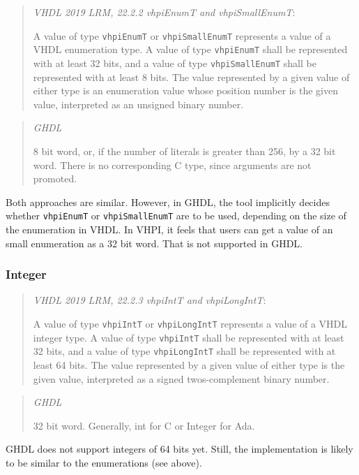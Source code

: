 \documentclass[
]{article}
\begin{document}
\begin{quote}
\emph{VHDL 2019 LRM, 22.2.2 vhpiEnumT and vhpiSmallEnumT}:

A value of type \texttt{vhpiEnumT} or \texttt{vhpiSmallEnumT} represents a value of a VHDL enumeration type.
A value of type \texttt{vhpiEnumT} shall be represented with at least 32 bits, and a value of type \texttt{vhpiSmallEnumT} shall be represented with at least 8 bits.
The value represented by a given value of either type is an enumeration value whose position number is the given value, interpreted as an unsigned binary number.
\end{quote}

\begin{quote}
\emph{GHDL}

8 bit word, or, if the number of literals is greater than 256, by a 32 bit word. There is no corresponding C type, since arguments are not promoted.
\end{quote}

Both approaches are similar. However, in GHDL, the tool implicitly decides whether \texttt{vhpiEnumT} or \texttt{vhpiSmallEnumT} are to be used, depending on the size of the enumeration in VHDL. In VHPI, it feels that users can get a value of an small enumeration as a 32 bit word. That is not supported in GHDL.

\hypertarget{integer}{%
\subsubsection{Integer}\label{integer}}

\begin{quote}
\emph{VHDL 2019 LRM, 22.2.3 vhpiIntT and vhpiLongIntT}:

A value of type \texttt{vhpiIntT} or \texttt{vhpiLongIntT} represents a value of a VHDL integer type.
A value of type \texttt{vhpiIntT} shall be represented with at least 32 bits, and a value of type \texttt{vhpiLongIntT} shall be represented with at least 64 bits.
The value represented by a given value of either type is the given value, interpreted as a signed twos-complement binary number.
\end{quote}

\begin{quote}
\emph{GHDL}

32 bit word. Generally, int for C or Integer for Ada.
\end{quote}

GHDL does not support integers of 64 bits yet. Still, the implementation is likely to be similar to the enumerations (see above).
\end{document}
